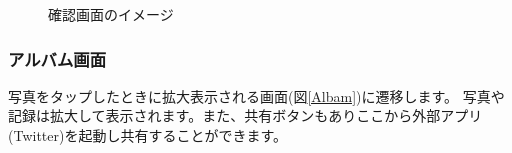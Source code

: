 \documentclass[a4j]{jarticle}
\begin{document}
\begin{figure}[H]
\begin{minipage}{0.5\hsize}
\begin{center}
   \caption{確認画面のイメージ}
   \label{checker}
  \end{center}
 \end{minipage}
\end{figure}

\newpage
\subsubsection{アルバム画面}
写真をタップしたときに拡大表示される画面(図\ref{Albam})に遷移します。
写真や記録は拡大して表示されます。また、共有ボタンもありここから外部アプリ(Twitter)を起動し共有することができます。
\end{document}
